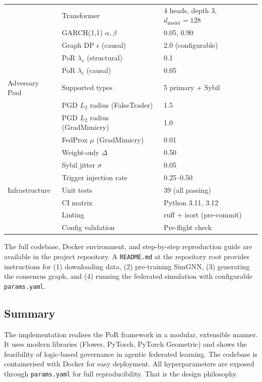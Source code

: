\documentclass[journal]{IEEEtran}
\begin{document}
\begin{table}[t]
\begin{tabular}{lll}
 & Transformer & 4 heads, depth 3, $d_{\text{model}}{=}128$ \\
 & GARCH(1,1) $\alpha, \beta$ & 0.05, 0.90 \\
 & Graph DP $\epsilon$ (causal) & 2.0 (configurable) \\
 & PoR $\lambda_s$ (structural) & 0.1 \\
 & PoR $\lambda_c$ (causal) & 0.05 \\
\hline
Adversary Pool & Supported types & 5 primary + Sybil \\
 & PGD $L_2$ radius (FalseTrader) & 1.5 \\
 & PGD $L_2$ radius (GradMimicry) & 1.0 \\
 & FedProx $\mu$ (GradMimicry) & 0.01 \\
 & Weight-only $\Delta$ & 0.50 \\
 & Sybil jitter $\sigma$ & 0.05 \\
 & Trigger injection rate & 0.25--0.50 \\
\hline
Infrastructure & Unit tests & 39 (all passing) \\
 & CI matrix & Python 3.11, 3.12 \\
 & Linting & ruff + isort (pre-commit) \\
 & Config validation & Pre-flight check \\
\hline
\end{tabular}
\end{table}

The full codebase, Docker environment, and step-by-step reproduction guide are available in the project repository. A \texttt{README.md} at the repository root provides instructions for (1) downloading data, (2) pre-training SimGNN, (3) generating the consensus graph, and (4) running the federated simulation with configurable \texttt{params.yaml}.

\subsection{Summary}

The implementation realises the PoR framework in a modular, extensible manner. It uses modern libraries (Flower, PyTorch, PyTorch Geometric) and shows the feasibility of logic-based governance in agentic federated learning. The codebase is containerised with Docker for easy deployment. All hyperparameters are exposed through \texttt{params.yaml} for full reproducibility. That is the design philosophy.

\newpage
\end{document}
